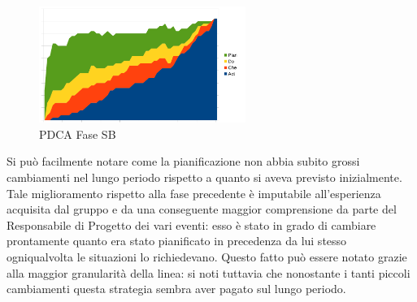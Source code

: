 		\begin{figure}[H]
			\centering
			\includegraphics[width=0.6\textwidth]{PianoDiQualifica/Pics/GraficoPDCAFaseSD.pdf}
			\caption{PDCA Fase SB}
		\end{figure}
		Si può facilmente notare come la pianificazione non abbia subito grossi cambiamenti nel lungo periodo rispetto a quanto si aveva previsto inizialmente. Tale miglioramento rispetto alla fase precedente è imputabile all'esperienza acquisita dal gruppo e da una conseguente maggior comprensione da parte del Responsabile di Progetto dei vari eventi: esso è stato in grado di cambiare prontamente quanto era stato pianificato in precedenza da lui stesso ogniqualvolta le situazioni lo richiedevano. Questo fatto può essere notato grazie alla maggior granularità della linea: si noti tuttavia che nonostante i tanti piccoli cambiamenti questa strategia sembra aver pagato sul lungo periodo.